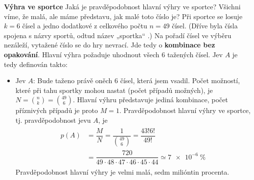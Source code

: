 \begin{mdframed}[style=mdexam]
  \begin{example}\label{mai:exam052}
    \textbf{Výhra ve sportce}\newline
    Jaká je pravděpodobnost hlavní výhry ve sportce? Všichni víme, že malá, ale máme představu, jak
    malé toto číslo je? Při sportce se losuje \(k = 6\) čísel a jedno dodatkové z celkového počtu
    \(n = 49\) čísel. (Dříve byla čísla spojena s názvy sportů, odtud název „sportka“ .) Na pořadí
    čísel ve výběru nezáleží, vytažené číslo se do hry nevrací. Jde tedy o \textbf{kombinace bez
    opakování}. Hlavní výhra požaduje uhodnout všech \num{6} tažených čísel. Jev \(A\) je tedy
    definován takto:
    
    \begin{itemize}[leftmargin=10pt,noitemsep]
      \item Jev \(A\): Bude taženo právě oněch \num{6} čísel, která jsem vsadil. Počet možností,
            které při tahu sportky mohou nastat (počet případů možných), je \(N = \binom{n}{k} =
            \binom{49}{6}\). Hlavní výhru představuje jediná kombinace, počet příznivých případů je
            proto \(M = 1\). Pravděpodobnost hlavní výhry ve sportce, tj. pravděpodobnost jevu
            \(A\), je
            \begin{gather*}
              \begin{align*}
              p(A) &= \dfrac{M}{N} = \dfrac{1}{\binom{49}{6}} = \dfrac{43!6!}{49!}   \\
                   &= \dfrac{720}{49\cdot48\cdot47\cdot46\cdot45\cdot44} 
                    \simeq \qty{7e-6}{\percent}
              \end{align*}    
            \end{gather*}
            Pravděpodobnost hlavní výhry je velmi malá, sedm milióntin procenta.
            

\end{itemize}
\end{example}
\end{mdframed}
